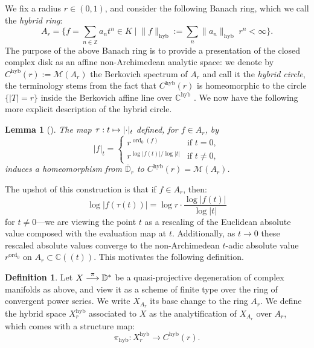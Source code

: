 \documentclass[JEP,XML,SOM,Unicode,published]{cedram}
\newcommand\mto{\mathchoice{\longmapsto}{\mapsto}{\mapsto}{\mapsto}}
\newcommand{\To}[1]{\mathchoice{\xrightarrow{\textstyle\kern4pt#1\kern3pt}}{\stackrel{#1}{\longrightarrow}}{}{}}
\let\ts\textstyle
\let\sep\mid
\newcommand{\lpr}{(\!(}
\newcommand{\rpr}{)\!)}
\newtheorem{lem}[equation]{Lemma}
\theoremstyle{definition}
\newtheorem{defn}[equation]{Definition}
\newcommand \C{\mathbb C}
\newcommand \D {\mathbb{D}}
\newcommand \Z{\mathbb Z}
\newcommand \M {\mathscr {M}}
\newcommand{\hyb}{\mathrm{hyb}}
\DeclareMathOperator{\ord}{ord}
\begin{document}
We fix a radius $r \in (0,1)$, and consider the following Banach ring, which we call the \emph{hybrid ring}:
\[
\ts
A_r = \bigl\{ f = \sum_{n \in \Z} a_n t^n \in K \sep \lVert f \rVert_{\hyb}:= \sum_{n} \lVert a_n \rVert_{\hyb} \; r^n < \infty \bigr\}.
\]
The purpose of the above Banach ring is to provide a presentation of the closed complex disk as an affine non-Archimedean analytic space: we denote by $C^{\hyb}(r):= \M(A_r)$ the Berkovich spectrum of $A_r$ and call it the \emph{hybrid circle}, the terminology stems from the fact that $C^{\hyb}(r)$ is homeomorphic to the circle $\{ \lvert T \rvert =r \}$ inside the Berkovich affine line over $\C^{\hyb}$ \cite{PoiZ}. We now have the following more explicit description of the hybrid circle.\begin{lem}[{\cite[Prop.\,A.4]{BJ}}] \label{cercle hyb}
The map $\tau: t \mto \lvert \cdot \rvert_t$ defined, for $f \in A_r$, by
\[
\lvert f \rvert_t =
\begin{cases}
r^{\ord_0(f)} & \text{if $t =0$},\\
r^{\log \lvert f(t) \rvert/ \log \rvert t \rvert} & \text{if $t \neq 0$,}
\end{cases}
\]
induces a homeomorphism from $\bar{\D}_r$ to $C^{\hyb}(r) =\M(A_r)$.
\end{lem}
The upshot of this construction is that if $f \in A_r$, then:
\[
\log \lvert f(\tau(t)) \rvert =\log r \cdot \frac{\log \lvert f(t) \rvert}{\log \lvert t \rvert}
\] for $t \neq 0$---we are viewing the point $t$ as a rescaling of the Euclidean absolute value composed with the evaluation map at $t$. Additionally, as $t \to 0$ these rescaled absolute values converge to the non-Archimedean $t$-adic absolute value $r^{\ord_0}$ on $A_r \subset \C\lpr t\rpr$. This motivates the following definition.
\begin{defn}
Let $X \To{\pi} \D^*$ be a quasi-projective degeneration of complex manifolds as above, and view it as a scheme of finite type over the ring of convergent power series. We write $X_{A_r}$ its base change to the ring $A_r$. We define the hybrid space $X^{\hyb}_r$ associated to $X$ as the analytification of $X_{A_r}$ over $A_r$, which comes with a structure map:
\[
\pi_{\hyb}: X_r^{\hyb} \to C^{\hyb}(r).
\]
\end{defn}
\end{document}
